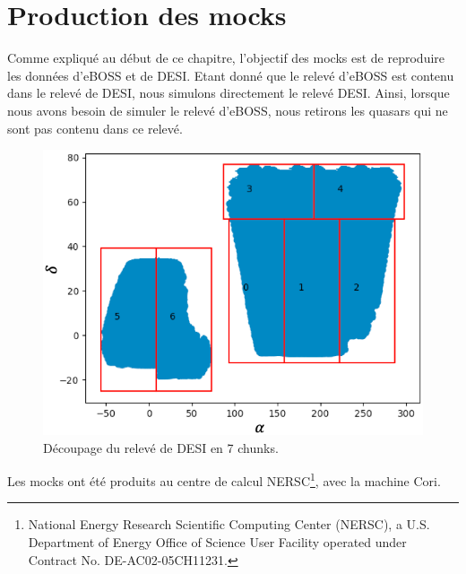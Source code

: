 \section{Production des mocks}
Comme expliqué au début de ce chapitre, l'objectif des mocks est de reproduire les données d'eBOSS et de DESI. Etant donné que le relevé d'eBOSS est contenu dans le relevé de DESI, nous simulons directement le relevé DESI. Ainsi, lorsque nous avons besoin de simuler le relevé d'eBOSS, nous retirons les quasars qui ne sont pas contenu dans ce relevé.
\begin{figure}
  \centering
  \includegraphics[scale=0.5]{chunks}
  \caption{Découpage du relevé de DESI en 7 chunks.}
  \label{fig:chunks}
\end{figure}
Les mocks ont été produits au centre de calcul NERSC\footnote{National Energy Research Scientific Computing Center (NERSC), a U.S. Department of Energy Office of Science User Facility operated under Contract No. DE-AC02-05CH11231.}, avec la machine Cori.
